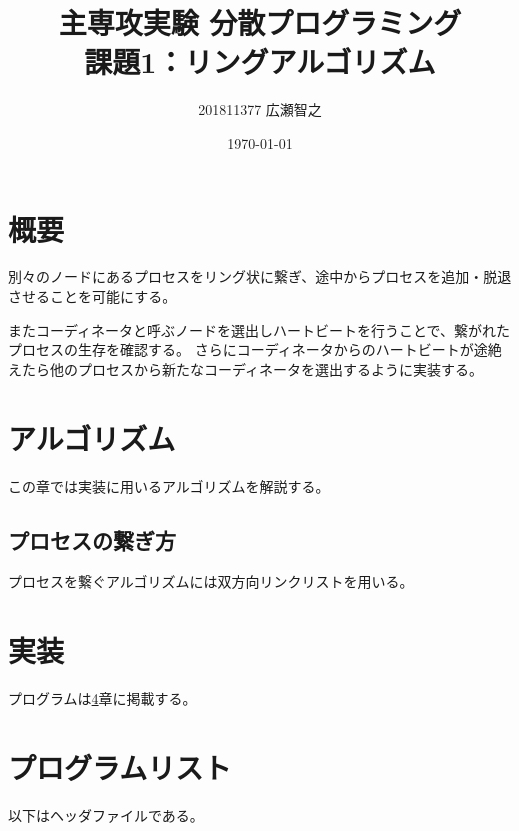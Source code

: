 \documentclass[a4paper]{jlreq}
\title{主専攻実験 分散プログラミング \\課題1：リングアルゴリズム}
\author{201811377 広瀬智之}
\date{\today}
\begin{document}
\maketitle

\section{概要}

別々のノードにあるプロセスをリング状に繋ぎ、途中からプロセスを追加・脱退させることを可能にする。

またコーディネータと呼ぶノードを選出しハートビートを行うことで、繋がれたプロセスの生存を確認する。
さらにコーディネータからのハートビートが途絶えたら他のプロセスから新たなコーディネータを選出するように実装する。

\section{アルゴリズム}

この章では実装に用いるアルゴリズムを解説する。

\subsection{プロセスの繋ぎ方}

プロセスを繋ぐアルゴリズムには双方向リンクリストを用いる。


\section{実装}

プログラムは\ref{sec:proglist}章に掲載する。



\section{プログラムリスト}
\label{sec:proglist}





以下はヘッダファイルである。




\end{document}
